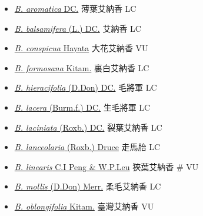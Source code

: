 \begin{itemize}
  \begin{itemize}
        \item[] \href{http://www.theplantlist.org/tpl1.1/search?q=Blumea+aromatica}{\textit{B. aromatica} DC.}   薄葉艾納香   LC
        \item[] \href{http://www.theplantlist.org/tpl1.1/search?q=Blumea+balsamifera}{\textit{B. balsamifera} (L.) DC.}   艾納香   LC
        \item[] \href{http://www.theplantlist.org/tpl1.1/search?q=Blumea+conspicua}{\textit{B. conspicua} Hayata}   大花艾納香   VU
        \item[] \href{http://www.theplantlist.org/tpl1.1/search?q=Blumea+formosana}{\textit{B. formosana} Kitam.}   裏白艾納香   LC
        \item[] \href{http://www.theplantlist.org/tpl1.1/search?q=Blumea+hieracifolia}{\textit{B. hieracifolia} (D.Don) DC.}   毛將軍   LC
        \item[] \href{http://www.theplantlist.org/tpl1.1/search?q=Blumea+lacera}{\textit{B. lacera} (Burm.f.) DC.}   生毛將軍   LC
        \item[] \href{http://www.theplantlist.org/tpl1.1/search?q=Blumea+laciniata}{\textit{B. laciniata} (Roxb.) DC.}   裂葉艾納香   LC
        \item[] \href{http://www.theplantlist.org/tpl1.1/search?q=Blumea+lanceolaria}{\textit{B. lanceolaria} (Roxb.) Druce}   走馬胎   LC
        \item[] \href{http://www.theplantlist.org/tpl1.1/search?q=Blumea+linearis}{\textit{B. linearis} C.I Peng \& W.P.Leu}   狹葉艾納香  \# VU
        \item[] \href{http://www.theplantlist.org/tpl1.1/search?q=Blumea+mollis}{\textit{B. mollis} (D.Don) Merr.}   柔毛艾納香   LC
        \item[] \href{http://www.theplantlist.org/tpl1.1/search?q=Blumea+oblongifolia}{\textit{B. oblongifolia} Kitam.}   臺灣艾納香   VU

\end{itemize}
\end{itemize}
